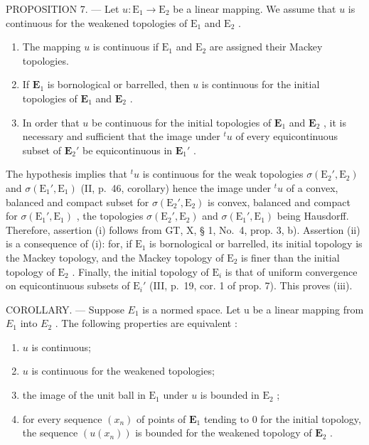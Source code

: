 PROPOSITION 7. --- Let \(u: \mathrm{E}_1 \to \mathrm{E}_2\) be a linear mapping. We assume that \(u\) is continuous for the weakened topologies of \(\mathrm{E}_1\) and \(\mathrm{E}_2\) .

\begin{enumerate}
\def\labelenumi{(\roman{enumi})}
\item
  The mapping \(u\) is continuous if \(\mathrm{E}_1\) and \(\mathrm{E}_2\) are assigned their Mackey topologies.
\item
  If \(\mathbf{E}_1\) is bornological or barrelled, then \(u\) is continuous for the initial topologies of \(\mathbf{E}_1\) and \(\mathbf{E}_2\) .
\item
  In order that \(u\) be continuous for the initial topologies of \(\mathbf{E}_1\) and \(\mathbf{E}_2\) , it is necessary and sufficient that the image under \(^t u\) of every equicontinuous subset of \(\mathbf{E}_2'\) be equicontinuous in \(\mathbf{E}_1'\) .
\end{enumerate}

The hypothesis implies that \({}^t u\) is continuous for the weak topologies \(\sigma(\mathrm{E}_2', \mathrm{E}_2)\) and \(\sigma(\mathrm{E}_1', \mathrm{E}_1)\) (II, p.~46, corollary) hence the image under \({}^t u\) of a convex, balanced and compact subset for \(\sigma(\mathrm{E}_2', \mathrm{E}_2)\) is convex, balanced and compact for \(\sigma(\mathrm{E}_1', \mathrm{E}_1)\) , the topologies \(\sigma(\mathrm{E}_2', \mathrm{E}_2)\) and \(\sigma(\mathrm{E}_1', \mathrm{E}_1)\) being Hausdorff. Therefore, assertion (i) follows from GT, X, § 1, No.~4, prop. 3, b). Assertion (ii) is a consequence of (i): for, if \(\mathrm{E}_1\) is bornological or barrelled, its initial topology is the Mackey topology, and the Mackey topology of \(\mathrm{E}_2\) is finer than the initial topology of \(\mathrm{E}_2\) . Finally, the initial topology of \(\mathrm{E}_i\) is that of uniform convergence on equicontinuous subsets of \(\mathrm{E}_i'\) (III, p.~19, cor. 1 of prop. 7). This proves (iii).

COROLLARY. --- Suppose \(E_{1}\) is a normed space. Let u be a linear mapping from \(E_{1}\) into \(E_{2}\) . The following properties are equivalent :

\begin{enumerate}
\def\labelenumi{\alph{enumi})}
\item
  \(u\) is continuous;
\item
  \(u\) is continuous for the weakened topologies;
\item
  the image of the unit ball in \(\mathrm{E}_1\) under \(u\) is bounded in \(\mathrm{E}_2\) ;
\item
  for every sequence \((x_{n})\) of points of \(\mathbf{E}_1\) tending to 0 for the initial topology, the sequence \((u(x_{n}))\) is bounded for the weakened topology of \(\mathbf{E}_2\) .
\end{enumerate}

